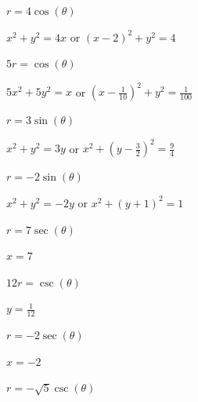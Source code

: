 \documentclass{ximera}
\begin{document}
\begin{question}
\begin{problem}
$r = 4\cos(\theta)$

\begin{solution}
$x^2 + y^2 = 4x$ or $(x-2)^2 + y^2 = 4$
\end{solution}
\end{problem}

\begin{problem}
$5r = \cos(\theta)$

\begin{solution}
$5x^2 + 5y^2 = x$ or $\left(x - \frac{1}{10}\right)^2+y^2 = \frac{1}{100}$
\end{solution}
\end{problem}

\begin{problem}
$r = 3\sin(\theta)$

\begin{solution}
$x^2 + y^2  = 3y$ or $x^2 + \left(y - \frac{3}{2}\right)^2 = \frac{9}{4}$
\end{solution}
\end{problem}

\begin{problem}
$r = -2\sin(\theta)$

\begin{solution}
$x^2 + y^2 = -2y$ or $x^2+(y+1)^2 = 1$ 
\end{solution}
\end{problem}

\begin{problem}
$r = 7\sec(\theta)$

\begin{solution}
$x=7$  
\end{solution}
\end{problem}

\begin{problem}
$12r = \csc(\theta)$

\begin{solution}
$y = \frac{1}{12}$
\end{solution}
\end{problem}

\begin{problem}
$r = -2\sec(\theta)$

\begin{solution}
$x = -2$ 
\end{solution}
\end{problem}

\begin{problem}
$r = -\sqrt{5} \csc(\theta)$


\end{problem}
\end{question}
\end{document}
